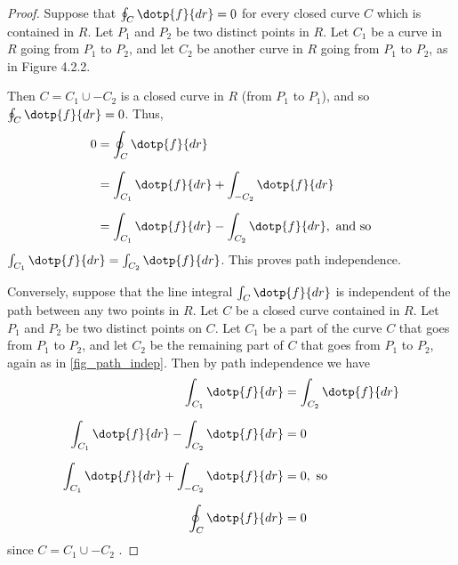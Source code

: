 
\begin{proof}
 Suppose that $\oint_{C}\dotp{f}{dr} = 0$ for every closed curve $C$  which is contained in $R$. Let $P_1$ and $P_2$ be two distinct points in $R$. Let $C_1$ be a curve in $R$ going from $P_1$ to $P_2$, and let $C_2$ be another curve in $R$ going from $P_1$ to $P_2$, as in Figure 4.2.2.
 
 
 Then $C = C_1\cup -C_2$ is a closed curve in $R$ (from $P_1$ to $P_1$), and so $\oint_{C}\dotp{f}{dr} = 0$. Thus,
 \begin{align*}
  0 &= \oint_{C}\dotp{f}{dr}\\[6pt]
   &= \int_{C_1}\dotp{f}{dr} + \int_{-C_2}\dotp{f}{dr}\\[6pt]
   &= \int_{C_1}\dotp{f}{dr} - \int_{C_2}\dotp{f}{dr},\text{ and so}
 \end{align*}
 $\int_{C_1}\dotp{f}{dr} = \int_{C_2}\dotp{f}{dr}$. This proves path independence.

 Conversely, suppose that the line integral $\int_{C}\dotp{f}{dr}$ is independent of the path between any two points in $R$. Let $C$ be a closed curve contained in $R$. Let $P_1$ and $P_2$ be two distinct points on $C$. Let $C_1$ be a part of the curve $C$ that goes from $P_1$ to $P_2$, and let $C_2$ be the remaining part of $C$ that goes from $P_1$ to $P_2$, again as in \autoref{fig_path_indep}. Then by path independence we have
 \begin{align*}
  \int_{C_1}\dotp{f}{dr} &= \int_{C_2}\dotp{f}{dr}\\[6pt]
  \int_{C_1}\dotp{f}{dr} - \int_{C_2}\dotp{f}{dr} &= 0\\[6pt]
  \int_{C_1}\dotp{f}{dr} + \int_{-C_2}\dotp{f}{dr} &= 0 ,\text{ so}\\[6pt]
  \oint_{C}\dotp{f}{dr} &= 0
 \end{align*}
 since $C = C_1\cup -C_2$ .
\end{proof}

